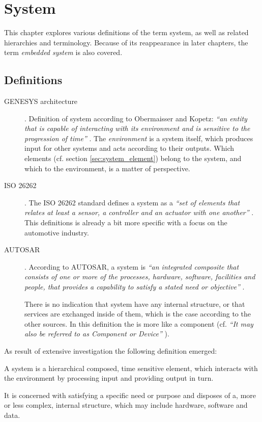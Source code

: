 \section{System}

\label{ch:system}
This chapter explores various definitions of the term system, as well as related hierarchies and terminology. Because of its reappearance in later chapters, the term \emph{embedded system} is also covered.

\subsection{Definitions}

\begin{description}

\item [GENESYS architecture].
Definition of system according to Obermaisser and Kopetz: \emph{``an entity that is capable of interacting with its environment and is sensitive to the progression of time''} \cite[p.7]{genesys}.
The \emph{environment} is a system itself, which produces input for other systems and acts according to their outputs. Which elements (cf. section \ref{sec:system_element}) belong to the system, and which to the environment, is a matter of perspective. 

\item [ISO 26262].
The ISO 26262 standard defines a system as a \emph{``set of elements that relates at least a sensor, a controller and an actuator with one another''} \cite{iso26262:1}. This definitions is already a bit more specific with a focus on the automotive industry.

\item [AUTOSAR].
According to AUTOSAR, a system is \emph{``an integrated composite that consists of one or more of the processes, hardware, software, facilities and people, that provides a capability to satisfy a stated need or objective''} \cite{autosar_glossary}.

There is no indication that system have any internal structure, or that services are exchanged inside of them, which is the case according to the other sources. In this definition the is more like a component (cf. \emph{``It may also be referred to as Component or Device''} \cite{arrowhead_inpr}).
\end{description}


As result of extensive investigation the following definition emerged:

\begin{myquote}
A system is a hierarchical composed, time sensitive element, which interacts with the environment by processing input and providing output in turn.

It is concerned with satisfying a specific need or purpose and disposes of a, more or less complex, internal structure, which may include hardware, software and data.
\end{myquote}

